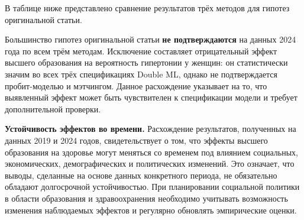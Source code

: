 \documentclass[a4paper,12pt]{article}
\begin{document}
В таблице ниже представлено сравнение результатов трёх методов для гипотез оригинальной статьи.

\begin{table}[H]
\centering
\caption{Сравнение результатов трёх методов по гипотезам оригинальной статьи}
\end{table}

Большинство гипотез оригинальной статьи \textbf{не подтверждаются} на данных 2024 года по всем трём методам.
Исключение составляет отрицательный эффект высшего образования на вероятность гипертонии у женщин: он статистически значим во всех трёх спецификациях Double ML, однако не подтверждается пробит-моделью и мэтчингом.
Данное расхождение указывает на то, что выявленный эффект может быть чувствителен к спецификации модели и требует дополнительной проверки.

\textbf{Устойчивость эффектов во времени.}
Расхождение результатов, полученных на данных 2019 и 2024 годов, свидетельствует о том, что эффекты высшего образования на здоровье могут меняться со временем под влиянием социальных, экономических, демографических и политических изменений.
Это означает, что выводы, сделанные на основе данных конкретного периода, не обязательно обладают долгосрочной устойчивостью.
При планировании социальной политики в области образования и здравоохранения необходимо учитывать возможность изменения наблюдаемых эффектов и регулярно обновлять эмпирические оценки.

\newpage
\tableofcontents
\end{document}
